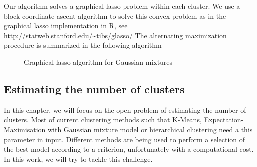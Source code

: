 Our algorithm solves a graphical lasso problem within each cluster. We use a block coordinate ascent algorithm \citep{mazum_lasso} to solve this convex problem as in the graphical lasso implementation in R, see \url{http://statweb.stanford.edu/~tibs/glasso/} The alternating maximization procedure is summarized in the following algorithm
\begin{figure}
\begin{center}
   \caption{Graphical lasso algorithm for Gaussian mixtures}
   \label{algo:PEM}
\end{center}
\end{figure}


\subsection{Estimating the number of clusters}
\label{estim_nb_clusters_sect}
In this chapter, we will focus on the open problem of estimating the number of clusters. Most of current clustering methods such that K-Means, Expectation-Maximisation with Gaussian mixture model or hierarchical clustering need a this parameter in input. Different methods are being used to perform a selection of the best model according to a criterion, unfortunately with a computational cost. In this work, we will try to tackle this challenge.

